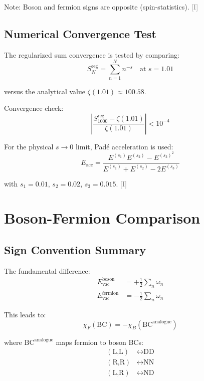 \documentclass[11pt,a4paper]{article}
\newcommand{\tagI}{\textcolor{gray}{[I]}}
\begin{document}
Note: Boson and fermion signs are opposite (spin-statistics). \tagI

\subsection{Numerical Convergence Test}

The regularized sum convergence is tested by comparing:
\begin{equation}
\label{eq:app-conv-test}
S_N^{\text{reg}} = \sum_{n=1}^N n^{-s} \quad \text{at } s = 1.01
\end{equation}

versus the analytical value $\zeta(1.01) \approx 100.58$.

Convergence check:
\begin{equation}
\label{eq:app-conv-check}
\left|\frac{S_{1000}^{\text{reg}} - \zeta(1.01)}{\zeta(1.01)}\right| < 10^{-4}
\end{equation}

For the physical $s \to 0$ limit, Padé acceleration is used:
\begin{equation}
\label{eq:app-pade}
E_{\text{acc}} = \frac{E^{(s_1)} E^{(s_2)} - E^{(s_3)}^2}{E^{(s_1)} + E^{(s_2)} - 2E^{(s_3)}}
\end{equation}

with $s_1 = 0.01$, $s_2 = 0.02$, $s_3 = 0.015$. \tagI

\section{Boson-Fermion Comparison}
\label{app:bf-compare}

\subsection{Sign Convention Summary}

The fundamental difference:
\begin{align}
\label{eq:app-boson-sign}
E_{\text{vac}}^{\text{boson}} &= +\frac{1}{2} \sum_n \omega_n \\
\label{eq:app-fermion-sign}
E_{\text{vac}}^{\text{fermion}} &= -\frac{1}{2} \sum_n \omega_n
\end{align}

This leads to:
\begin{equation}
\label{eq:app-chi-relation}
\chi_F(\text{BC}) = -\chi_B(\text{BC}^{\text{analogue}})
\end{equation}

where $\text{BC}^{\text{analogue}}$ maps fermion to boson BCs:
\begin{align}
\label{eq:app-bc-map-1}
(\text{L,L}) &\leftrightarrow \text{DD} \\
\label{eq:app-bc-map-2}
(\text{R,R}) &\leftrightarrow \text{NN} \\
\label{eq:app-bc-map-3}
(\text{L,R}) &\leftrightarrow \text{ND}
\end{align}
\end{document}
